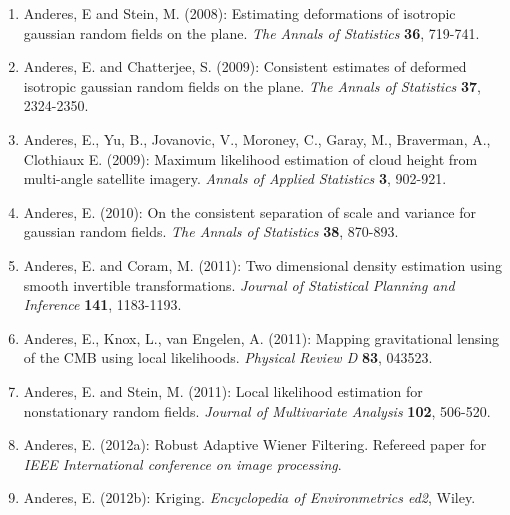 \documentclass[11pt]{article}
\begin{document}
\begin{enumerate}[labelindent=0pt]



\item
Anderes, E and Stein, M. (2008): Estimating deformations of isotropic gaussian random fields on the plane. \textit{The Annals of Statistics} {\bf 36}, 719-741.


\item
Anderes, E. and Chatterjee, S. (2009): Consistent estimates of deformed isotropic gaussian random fields on the plane. \textit{The Annals of Statistics} {\bf 37}, 2324-2350.




\item
Anderes, E., Yu, B., Jovanovic, V., Moroney, C., Garay, M., Braverman, A., Clothiaux E. (2009):
Maximum likelihood estimation of cloud height from multi-angle satellite imagery.   \textit{Annals of Applied Statistics} {\bf 3}, 902-921.


\item
Anderes, E. (2010):  On the consistent separation of scale and variance for gaussian random fields. \textit{The Annals of Statistics} {\bf 38}, 870-893.


\item
Anderes, E. and Coram, M. (2011):   Two dimensional density estimation using smooth invertible transformations.
 \textit{Journal of Statistical Planning and Inference} {\bf 141}, 1183-1193.





\item
Anderes, E., Knox, L., van Engelen, A.  (2011):  Mapping gravitational lensing of the CMB using local likelihoods.
\textit{Physical Review D} {\bf 83}, 043523.



\item
Anderes, E. and Stein, M. (2011):  Local likelihood estimation for nonstationary random fields.  \textit{Journal of Multivariate Analysis} {\bf 102}, 506-520.



\item
Anderes, E. (2012a):  Robust Adaptive Wiener Filtering.  Refereed paper for \textit{IEEE International conference on image processing}.


\item
Anderes, E. (2012b): Kriging.  \textit{Encyclopedia of Environmetrics ed2}, Wiley.



\end{enumerate}
\end{document}
